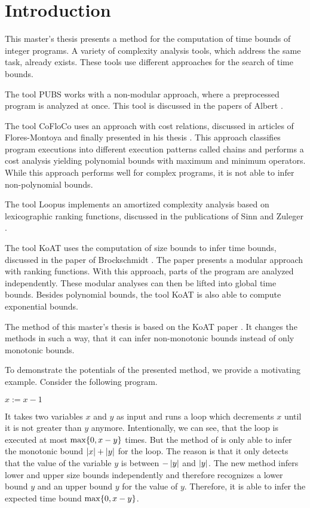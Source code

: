 \section{Introduction}

This master's thesis presents a method for the computation of time bounds of integer programs.
A variety of complexity analysis tools, which address the same task, already exists.
These tools use different approaches for the search of time bounds.

The tool PUBS works with a non-modular approach, where a preprocessed program is analyzed at once.
This tool is discussed in the papers of Albert \cite{pubs1, pubs2}.

The tool CoFloCo uses an approach with cost relations, discussed in articles of Flores-Montoya \cite{cofloco1, cofloco2, cofloco4} and finally presented in his thesis \cite{cofloco3}.
This approach classifies program executions into different execution patterns called chains and performs a cost analysis yielding polynomial bounds with maximum and minimum operators. 
While this approach performs well for complex programs, it is not able to infer non-polynomial bounds.

The tool Loopus implements an amortized complexity analysis based on lexicographic ranking functions, discussed in the publications of Sinn and Zuleger \cite{loopus1, loopus2}.

The tool KoAT uses the computation of size bounds to infer time bounds, discussed in the paper of Brockschmidt \cite{koat}.
The paper presents a modular approach with ranking functions.
With this approach, parts of the program are analyzed independently.
These modular analyses can then be lifted into global time bounds.
Besides polynomial bounds, the tool KoAT \cite{koat} is also able to compute exponential bounds.

The method of this master's thesis is based on the KoAT paper \cite{koat}.
It changes the methods in such a way, that it can infer non-monotonic bounds instead of only monotonic bounds.

To demonstrate the potentials of the presented method, we provide a motivating example.
Consider the following program.

\begin{algorithmic}
    \State $x := x - 1$
  \EndWhile
\end{algorithmic}

It takes two variables $x$ and $y$ as input and runs a loop which decrements $x$ until it is not greater than $y$ anymore.
Intentionally, we can see, that the loop is executed at most $\max \lbrace 0, x-y \rbrace$ times.
But the method of \cite{koat} is only able to infer the monotonic bound $\left|x\right|+\left|y\right|$ for the loop.
The reason is that it only detects that the value of the variable $y$ is between $-\left|y\right|$ and $\left|y\right|$.
The new method infers lower and upper size bounds independently and therefore recognizes a lower bound $y$ and an upper bound $y$ for the value of $y$.
Therefore, it is able to infer the expected time bound $\max \lbrace 0, x-y \rbrace$.

